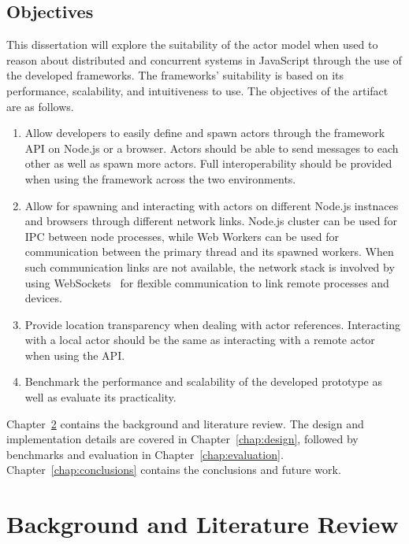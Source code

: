 \documentclass[oneside]{um-fict}
\begin{document}
\section{Objectives}\label{section:objectives}
This dissertation will explore the suitability of the actor model when used to reason about distributed and concurrent systems in JavaScript through the use of the developed frameworks. The frameworks' suitability is based on its performance, scalability, and intuitiveness to use. The objectives of the artifact are as follows.
\begin{enumerate}
    \item Allow developers to easily define and spawn actors through the framework API on Node.js or a browser. Actors should be able to send messages to each other as well as spawn more actors. Full interoperability should be provided when using the framework across the two environments.
    \item Allow for spawning and interacting with actors on different Node.js instnaces and browsers through different network links. Node.js cluster\cite{cluster} can be used for IPC between node processes, while Web Workers\cite{webworkers} can be used for communication between the primary thread and its spawned workers. When such communication links are not available, the network stack is involved by using WebSockets~\cite{websocket} for flexible communication to link remote processes and devices.
    \item Provide location transparency when dealing with actor references. Interacting with a local actor should be the same as interacting with a remote actor when using the API.
    \item Benchmark the performance and scalability of the developed prototype as well as evaluate its practicality.
\end{enumerate}

Chapter~\ref{chap:background} contains the background and literature review. The design and implementation details are covered in Chapter~\ref{chap:design}, followed by benchmarks and evaluation in Chapter~\ref{chap:evaluation}. Chapter~\ref{chap:conclusions} contains the conclusions and future work.

\chapter{Background and Literature Review}\label{chap:background}
\end{document}
